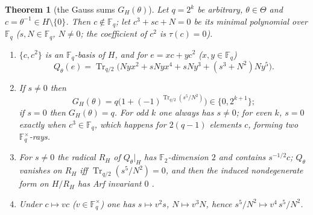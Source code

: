 \documentclass[12pt,a4paper]{amsart}
\newtheorem{theorem}{Theorem}[section]
\theoremstyle{definition}
\newcommand{\F}{\mathbb{F}}
\newcommand{\Tr}{\operatorname{Tr}}
\begin{document}
\begin{theorem}[the Gauss sums $G_H(\theta)$]\label{thm:GH}
Let $q=2^k$ be arbitrary, $\theta\in\Theta$ and $c=\theta^{-1}\in H\setminus\{0\}$. Then $c\notin\F_q$; let $c^3+sc+N=0$ be its minimal polynomial over $\F_q$ ($s,N\in\F_q$, $N\ne0$; the coefficient of $c^2$ is $\tau(c)=0$).
\begin{enumerate}[label=\textup{(\roman*)},leftmargin=2em]
\item $\{c,c^2\}$ is an $\F_q$-basis of $H$, and for $e=xc+yc^2$ ($x,y\in\F_q$)
\[
Q_\theta(e)=\Tr_{q/2}\bigl(Nyx^2+sNyx^4+sNy^3+(s^3+N^2)Ny^5\bigr).
\]
\item If $s\ne0$ then
\[
G_H(\theta)=q\bigl(1+(-1)^{\Tr_{q/2}(s^5/N^2)}\bigr)\in\{0,2^{k+1}\};
\]
if $s=0$ then $G_H(\theta)=q$. For odd $k$ one always has $s\ne0$; for even $k$, $s=0$ exactly when $c^3\in\F_q$, which happens for $2(q-1)$ elements $c$, forming two $\F_q^\times$-rays.
\item For $s\ne0$ the radical $R_H$ of $Q_\theta|_H$ has $\F_2$-dimension $2$ and contains $s^{-1/2}c$; $Q_\theta$ vanishes on $R_H$ iff $\Tr_{q/2}(s^5/N^2)=0$, and then the induced nondegenerate form on $H/R_H$ has Arf invariant $0$ \cite{Arf}.
\item Under $c\mapsto vc$ ($v\in\F_q^\times$) one has $s\mapsto v^2s$, $N\mapsto v^3N$, hence $s^5/N^2\mapsto v^4\,s^5/N^2$.
\end{enumerate}
\end{theorem}
\end{document}
